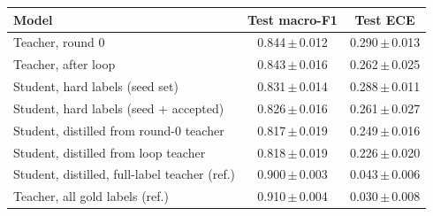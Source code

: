 \begin{tabular}{lcc}
\toprule
Model & Test macro-F1 & Test ECE \\
\midrule
Teacher, round 0 & 0.844\,$\pm$\,0.012 & 0.290\,$\pm$\,0.013 \\
Teacher, after loop & 0.843\,$\pm$\,0.016 & 0.262\,$\pm$\,0.025 \\
\addlinespace
Student, hard labels (seed set) & 0.831\,$\pm$\,0.014 & 0.288\,$\pm$\,0.011 \\
Student, hard labels (seed + accepted) & 0.826\,$\pm$\,0.016 & 0.261\,$\pm$\,0.027 \\
Student, distilled from round-0 teacher & 0.817\,$\pm$\,0.019 & 0.249\,$\pm$\,0.016 \\
Student, distilled from loop teacher & 0.818\,$\pm$\,0.019 & 0.226\,$\pm$\,0.020 \\
\addlinespace
Student, distilled, full-label teacher (ref.) & 0.900\,$\pm$\,0.003 & 0.043\,$\pm$\,0.006 \\
Teacher, all gold labels (ref.) & 0.910\,$\pm$\,0.004 & 0.030\,$\pm$\,0.008 \\
\bottomrule
\end{tabular}
